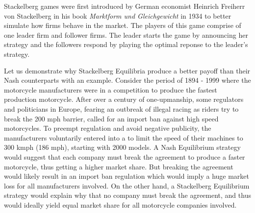 
Stackelberg games were first introduced by German economist Heinrich Freiherr von Stackelberg in his book \textit{Marktform und Gleichgewicht} in 1934 \cite{S34} to better simulate how firms behave in the market. The players of this game comprise of one leader firm and follower firms. The leader starts the game by announcing her strategy and the followers respond by playing the optimal reponse to the leader's strategy.

Let us demonstrate why Stackelberg Equilibria produce a better payoff than their Nash counterparts with an example. Consider the period of 1894 - 1999 where the motorcycle manufacturers were in a competition to produce the fastest production motorcycle. After over a century of one-upmanship, some regulators and politicians in Europe, fearing an outbreak of illegal racing as riders try to break the 200 mph barrier, called for an import ban against high speed motorcycles. To preempt regulation and avoid negative publicity, the manufacturers voluntarily entered into a  to limit the speed of their machines to 300 kmph (186 mph), starting with 2000 models. A Nash Equilibrium strategy would suggest that each company must break the agreement to produce a faster motorcycle, thus getting a higher market share. But breaking the agreement would likely result in an import ban regulation which would imply a huge market loss for all manufacturers involved. On the other hand, a Stackelberg Equilibrium strategy would explain why that no company must break the agreement, and thus would ideally yield equal market share for all motorcycle companies involved.\cite{WIKI00}

